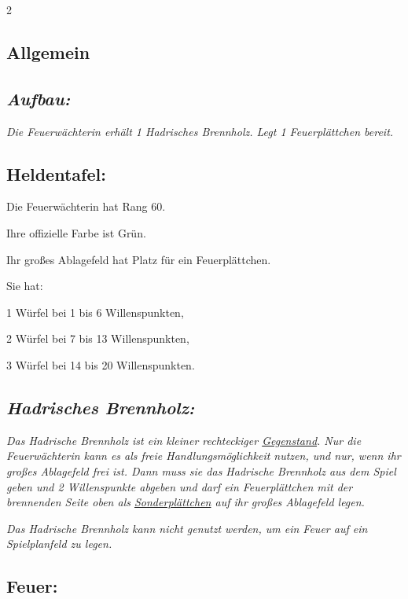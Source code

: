 \documentclass[10pt, a4paper, oneside]{book}
\newcommand{\fan}[1]{\textit{#1}}
\begin{document}
\begin{multicols*}{2}\raggedcolumns


\begin{nobgcolor}

\section{Allgemein}


\subsection{\fan{Aufbau:}}

\fan{Die Feuerwächterin erhält 1 Hadrisches Brennholz. Legt 1 Feuerplättchen bereit.}



\subsection{Heldentafel:}

Die Feuerwächterin hat Rang 60.

Ihre offizielle Farbe ist Grün.

Ihr großes Ablagefeld hat Platz für ein Feuerplättchen.

Sie hat:

\bullet{} 1 Würfel bei 1 bis 6 Willenspunkten,

\bullet{} 2 Würfel bei 7 bis 13 Willenspunkten,

\bullet{} 3 Würfel bei 14 bis 20 Willenspunkten.




\subsection{\fan{Hadrisches Brennholz:}}

\fan{Das Hadrische Brennholz ist ein kleiner rechteckiger \hyperref[gegenstaende-und-sonderplaettchen]{Gegenstand}. Nur die Feuerwächterin kann es als freie Handlungsmöglichkeit nutzen, und nur, wenn ihr großes Ablagefeld frei ist. Dann muss sie das Hadrische Brennholz aus dem Spiel geben und 2 Willenspunkte abgeben und darf ein Feuerplättchen mit der brennenden Seite oben als \hyperref[gegenstaende-und-sonderplaettchen]{\fan{Sonderplättchen}} auf ihr großes Ablagefeld legen.}

\fan{Das Hadrische Brennholz kann nicht genutzt werden, um ein Feuer auf ein Spielplanfeld zu legen.}


\subsection{Feuer:}


\end{nobgcolor}
\end{multicols*}
\end{document}
